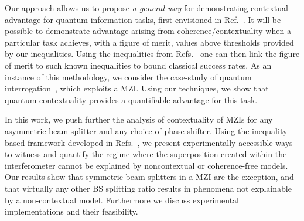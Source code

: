 \documentclass[letterpaper,onecolumn,12pt,accepted=2024-01-17]{article}
\begin{document}
Our approach allows us to propose \textit{a general way} for demonstrating contextual advantage for quantum information tasks, first envisioned in Ref.~\cite{Lostaglio2020contextualadvantage}. It will be possible to demonstrate advantage arising from coherence/contextuality when a particular task achieves, with a figure of merit, values above thresholds provided by our inequalities.  {Using the inequalities from Refs.~\cite{galvaobroad2020quantumandclassical,wagner2022inequalities} one can then link the figure of merit to such known inequalities to bound classical success rates. }As an instance of this methodology, we consider the case-study of quantum interrogation~\cite{elitzur1993quantum,vaidman1996interaction,kwiat1995interactionfree,kwiat1999high,rudolph2000better}, which exploits a MZI. Using our techniques, we show that quantum contextuality provides a quantifiable advantage for this task. 

{In this work, }we push further the analysis of contextuality of MZIs for any asymmetric beam-splitter and any choice of phase-shifter. {Using the inequality-based framework developed in  Refs.~\cite{galvaobroad2020quantumandclassical,wagner2022inequalities}}, we present experimentally accessible ways to witness and quantify the regime where the superposition created within the interferometer cannot be explained by noncontextual or coherence-free models. Our results show that symmetric beam-splitters in a MZI are the exception, and that virtually any other BS splitting ratio results in phenomena not explainable by a non-contextual model. Furthermore we discuss experimental implementations and their feasibility. 
\end{document}
